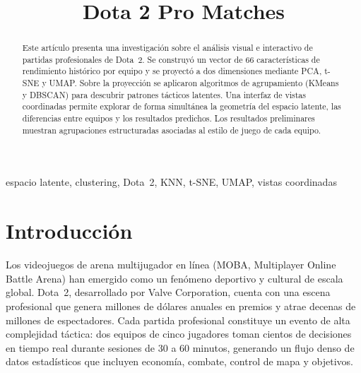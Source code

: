 \documentclass[conference]{IEEEtran}
\begin{document}
\title{Dota 2 Pro Matches}

\author{
}

\maketitle

\begin{abstract}
Este artículo presenta una investigación sobre el análisis
visual e interactivo de partidas profesionales de
Dota~2. Se construyó un vector de 66 características de rendimiento
histórico por equipo y se proyectó a dos dimensiones mediante PCA,
t-SNE y UMAP. Sobre la proyección se aplicaron algoritmos de
agrupamiento (KMeans y DBSCAN) para descubrir patrones tácticos
latentes. Una interfaz de vistas coordinadas permite explorar de forma
simultánea la geometría del espacio latente, las diferencias entre
equipos y los resultados predichos. Los resultados preliminares
muestran agrupaciones estructuradas asociadas al estilo de juego de
cada equipo.
\end{abstract}

\begin{IEEEkeywords}
espacio latente, clustering, Dota~2, KNN, t-SNE, UMAP, vistas coordinadas
\end{IEEEkeywords}

\section{Introducción}

Los videojuegos de arena multijugador en línea (MOBA, Multiplayer Online Battle Arena) han emergido como un fenómeno deportivo y cultural de escala global. Dota~2, desarrollado por Valve Corporation, cuenta con una escena profesional que genera millones de dólares anuales en premios y atrae decenas de millones de espectadores. Cada partida profesional constituye un evento de alta complejidad táctica: dos equipos de cinco jugadores toman cientos de decisiones en tiempo real durante sesiones de 30 a 60 minutos, generando un flujo denso de datos estadísticos que incluyen economía, combate, control de mapa y objetivos.
\end{document}
